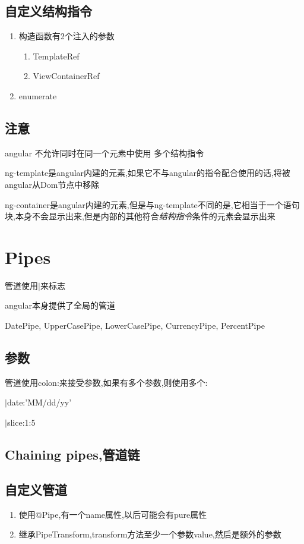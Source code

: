 \documentclass{article}
\begin{document}
\subsection{自定义结构指令}

\begin{enumerate}

	\item 构造函数有2个注入的参数
		\begin{enumerate}
			\item TemplateRef
			\item ViewContainerRef
		\end{enumerate}
	\item enumerate

\end{enumerate}

\subsection{注意}

angular 不允许同时在同一个元素中使用 多个结构指令

ng-template是angular内建的元素,如果它不与angular的指令配合使用的话,将被angular从Dom节点中移除

ng-container是angular内建的元素,但是与ng-template不同的是,它相当于一个语句块,本身不会显示出来,但是内部的其他符合\emph{结构指令}条件的元素会显示出来 


\section{Pipes}

管道使用$|$来标志

angular本身提供了全局的管道

DatePipe, UpperCasePipe, LowerCasePipe, CurrencyPipe, PercentPipe

\subsection{参数}
管道使用colon:来接受参数,如果有多个参数,则使用多个:
\par $|$date:'MM/dd/yy'
\par $|$slice:1:5

\subsection{Chaining pipes,管道链}

\subsection{自定义管道}
\begin{enumerate}
	\item 使用@Pipe,有一个name属性,以后可能会有pure属性
	\item 继承PipeTransform,transform方法至少一个参数value,然后是额外的参数
\end{enumerate}
\end{document}
